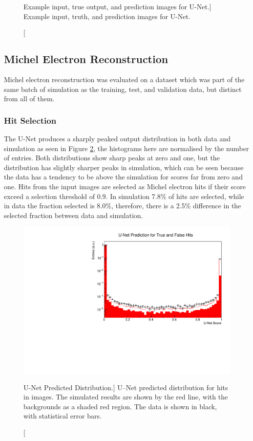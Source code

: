 \begin{figure}
	\caption
	[Example input, true output, and prediction images for U-Net.]
	{Example input, truth, and prediction images for U-Net.}
	\label{fig:unet_example}
\end{figure}

\subsection{Michel Electron Reconstruction}

Michel electron reconstruction was evaluated on a dataset which was part of the 
same batch of simulation as the training, test, and validation data, but
distinct from all of them. 

\subsubsection{Hit Selection}

The U-Net produces a sharply peaked output distribution in both data and
simulation as seen in Figure \ref{fig:unet_pred_data}, the histograms here are
normalised by the number of entries. Both distributions show sharp peaks at zero
and one, but the distribution has slightly sharper peaks in simulation, which 
can be seen because the data has a tendency to be above the simulation for
scores far from zero and one. Hits from the input images are selected as 
Michel electron hits if their score exceed a selection threshold of 0.9. In 
simulation 7.8\% of hits are selected, while in data the fraction selected is 
8.0\%, therefore, there is a 2.5\% difference in the selected fraction between 
data and simulation.  
\begin{figure}
	\centering
	\includegraphics[width=\textwidth]{figures/unet_pred_data.pdf}
	\caption
	[U-Net Predicted Distribution.]
	{U--Net predicted distribution for hits in images. The simulated results are
	shown by the red line, with the backgrounds as a shaded red region. The data 
	is shown in black, with statistical error bars.}
	\label{fig:unet_pred_data}
\end{figure}

